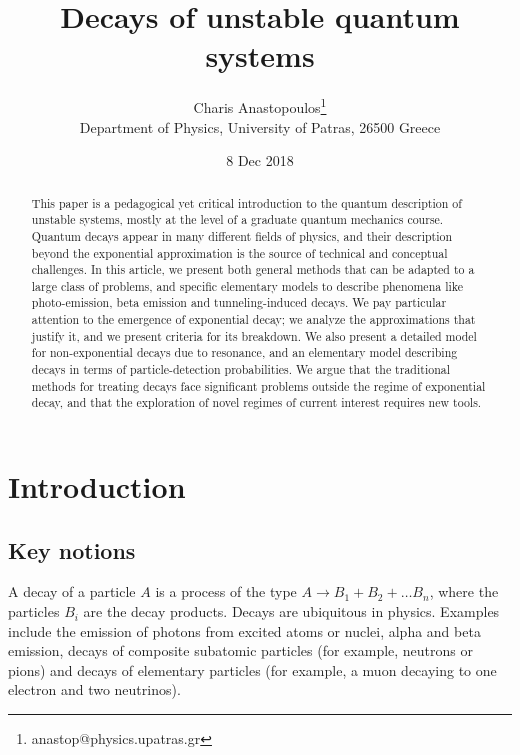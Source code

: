 \documentclass[12pt]{article}
\numberwithin{equation}{section}
\begin{document}
\title{Decays of unstable quantum systems}
\author{Charis Anastopoulos\footnote{anastop@physics.upatras.gr}\\ {\small Department of Physics, University of Patras, 26500 Greece} }
\date{8 Dec 2018}
\maketitle

\begin{abstract}
This paper is a  pedagogical yet  critical  introduction to the quantum description of  unstable systems,  mostly at the level of  a graduate quantum mechanics course. Quantum decays appear in many different fields of physics, and their description beyond the exponential approximation is the source of technical and conceptual challenges.
In this article, we present both general methods that can be adapted to a large class of problems, and specific elementary models to describe phenomena
 like   photo-emission, beta emission and tunneling-induced decays. We pay particular attention to the emergence of exponential decay;  we analyze   the approximations that justify it,  and we present criteria for its breakdown. We also present  a detailed model for non-exponential decays due to resonance, and an elementary model describing  decays in terms of particle-detection probabilities.  We argue that the traditional methods for treating decays face significant problems outside the regime of exponential decay, and that the exploration of  novel regimes of current interest requires new tools.

\end{abstract}

\newpage

\section{Introduction}

\subsection{Key notions}

A decay of a particle $A$ is a process of the type
 $A \rightarrow B_1 + B_2 + \ldots B_n$, where  the particles  $B_i$ are  the decay products. Decays are ubiquitous in physics. Examples include the emission of photons from excited atoms or nuclei, alpha and beta emission, decays of composite subatomic particles (for example, neutrons or  pions) and decays of elementary particles (for example, a muon decaying to one electron and two neutrinos).
\end{document}
